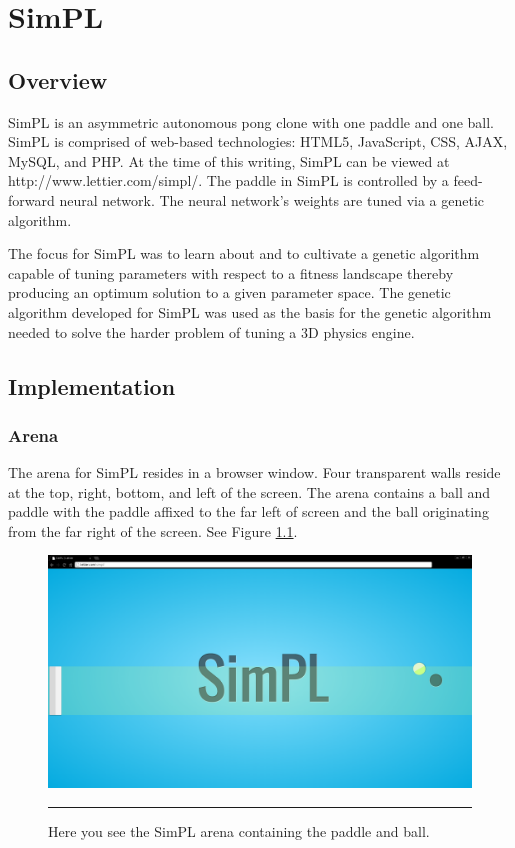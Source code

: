 \chapter{SimPL}

\label{Chapter3}

\section{Overview}


SimPL is an asymmetric autonomous pong clone with one paddle and one ball. SimPL is comprised of web-based technologies: HTML5, JavaScript, CSS, AJAX, MySQL, and PHP. At the time of this writing, SimPL can be viewed at http://www.lettier.com/simpl/. The paddle in SimPL is controlled by a feed-forward neural network. The neural network's weights are tuned via a genetic algorithm. 

The focus for SimPL was to learn about and to cultivate a genetic algorithm capable of tuning parameters with respect to a fitness landscape thereby producing an optimum solution to a given parameter space. The genetic algorithm developed for SimPL was used as the basis for the genetic algorithm needed to solve the harder problem of tuning a 3D physics engine. 

\section{Implementation}

\subsection{Arena}

The arena for SimPL resides in a browser window. Four transparent walls reside at the top, right, bottom, and left of the screen. The arena contains a ball and paddle with the paddle affixed to the far left of screen and the ball originating from the far right of the screen. See Figure \ref{fig:arena}.

\begin{figure}[htbp]  
  \centering
  \includegraphics[scale=0.2]{../Figures/Chapter3/arena.png}
  \rule{35em}{0.5pt}
  \caption[SimPL Arena]{Here you see the SimPL arena containing the paddle and ball.}
  \label{fig:arena}
\end{figure}

